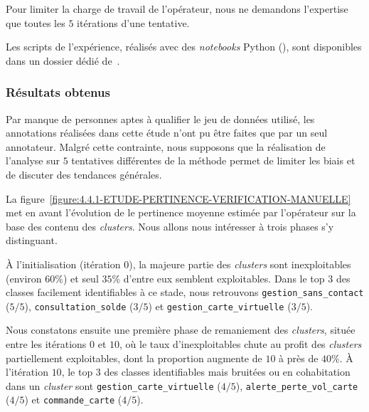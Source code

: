 			Pour limiter la charge de travail de l'opérateur, nous ne demandons l'expertise que toutes les $5$ itérations d'une tentative.
			
			\begin{leftBarInformation}
				Les scripts de l'expérience, réalisés avec des \textit{notebooks} Python (\cite{van-rossum-drake:2009:python-reference-manual}), sont disponibles dans un dossier dédié de~\cite{schild:2021:cognitivefactory-interactiveclusteringcomparativestudy}.
			\end{leftBarInformation}
			

		\subsubsection{Résultats obtenus}
			
			\begin{leftBarWarning}
				Par manque de personnes aptes à qualifier le jeu de données utilisé, les annotations réalisées dans cette étude n'ont pu être faites que par un seul annotateur.
				Malgré cette contrainte, nous supposons que la réalisation de l'analyse sur $5$ tentatives différentes de la méthode permet de limiter les biais et de discuter des tendances générales.
			\end{leftBarWarning}
		
			La figure~\ref{figure:4.4.1-ETUDE-PERTINENCE-VERIFICATION-MANUELLE} met en avant l'évolution de le pertinence moyenne estimée par l'opérateur sur la base des contenu des \textit{clusters}.
			Nous allons nous intéresser à trois phases s'y distinguant.
			
			À l'initialisation (itération $0$), la majeure partie des \textit{clusters} sont inexploitables (environ $60$\%) et seul $35$\% d'entre eux semblent exploitables.
			Dans le top $3$ des classes facilement identifiables à ce stade, nous retrouvons \texttt{gestion\_sans\_contact} ($5/5$), \texttt{consultation\_solde} ($3/5$) et \texttt{gestion\_carte\_virtuelle} ($3/5$).
			
			Nous constatons ensuite une première phase de remaniement des \textit{clusters}, située entre les itérations $0$ et $10$, où le taux d'inexploitables chute au profit des \textit{clusters} partiellement exploitables, dont la proportion augmente de $10$ à près de $40$\%.
			À l'itération $10$, le top $3$ des classes identifiables mais bruitées ou en cohabitation dans un \textit{cluster} sont \texttt{gestion\_carte\_virtuelle} ($4/5$),  \texttt{alerte\_perte\_vol\_carte} ($4/5$) et  \texttt{commande\_carte} ($4/5$).
			

